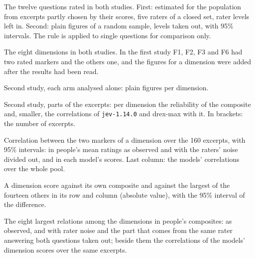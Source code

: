 \begin{table}[H]\centering
\caption{The twelve questions rated in both studies. First: estimated for the population from excerpts partly
chosen by their scores, five raters of a closed set, rater levels left in. Second: plain figures of a random
sample, levels taken out, with 95\% intervals. The rule is applied to single questions for comparison
only.}\label{tab:s2replication}

\end{table}

\begin{table}[H]\centering
\caption{The eight dimensions in both studies. In the first study F1, F2, F3 and F6 had two rated markers and
the others one, and the figures for a dimension were added after the results had been read.}\label{tab:s2repdim}

\end{table}

\begin{table}[H]\centering
\caption{Second study, each arm analysed alone: plain figures per dimension.}\label{tab:s2armdims}

\end{table}

\begin{table}[H]\centering
\caption{Second study, parts of the excerpts: per dimension the reliability of the composite and, smaller, the
correlations of \texttt{jev-1.14.0} and drex-max with it. In brackets: the number of excerpts.}\label{tab:s2parts}

\end{table}

\begin{table}[H]\centering
\caption{Correlation between the two markers of a dimension over the 160 excerpts, with 95\% intervals: in
people's mean ratings as observed and with the raters' noise divided out, and in each model's scores. Last
column: the models' correlations over the whole pool.}\label{tab:s2markercorr}

\end{table}

\begin{table}[H]\centering
\caption{A dimension score against its own composite and against the largest of the fourteen others in its row
and column (absolute value), with the 95\% interval of the difference.}\label{tab:s2cross}

\end{table}

\begin{table}[H]\centering
\caption{The eight largest relations among the dimensions in people's composites: as observed, and with rater
noise and the part that comes from the same rater answering both questions taken out; beside them the
correlations of the models' dimension scores over the same excerpts.}\label{tab:s2halo}

\end{table}

